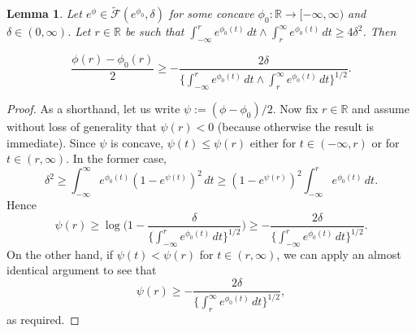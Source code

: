 \documentclass[a4paper,12pt]{article}
\newtheorem{lemma}[theorem]{Lemma}
\begin{document}
%
\begin{lemma}
  \label{Lem:EnvelopeLowerBound}
  Let $e^{\phi} \in \tilde{\mathcal{F}}(e^{\phi_0}, \delta)$ for some concave $\phi_0:\mathbb{R} \rightarrow [-\infty,\infty)$ and $\delta \in (0,\infty)$. Let $r \in \mathbb{R}$ be such that $\int_{-\infty}^r e^{\phi_0(t)} \, dt \wedge \int_r^{\infty} e^{\phi_0(t)} \, dt \geq 4\delta^2$. Then

  \[ 
    \frac{\phi(r) - \phi_0(r)}{2} \geq
    - \frac{2\delta}{\bigl\{ \int_{-\infty}^r e^{\phi_0(t)} \, dt \wedge \int_r^{\infty} e^{\phi_0(t)} \, dt \bigr\}^{1/2}}.
  \]
\end{lemma}
\begin{proof}
As a shorthand, let us write $\psi := (\phi - \phi_0)/2$.  Now fix $r \in \mathbb{R}$ and assume without loss of generality that $\psi(r) < 0$ (because otherwise the result is immediate).  Since $\psi$ is concave, $\psi(t) \leq \psi(r)$ either for $t \in (-\infty, r)$ or for $t \in (r, \infty)$.  In the former case,
  \[
    \delta^2 \geq \int_{-\infty}^\infty e^{\phi_0(t)} (1 - e^{\psi(t)})^2 \, dt \geq (1 - e^{\psi(r)})^2 \int_{-\infty}^r e^{\phi_0(t)} \, dt.
  \]
Hence
\[
   \psi(r) \geq \log \biggl(1 -   \frac{\delta}{\bigl\{\int_{-\infty}^r e^{\phi_0(t)} \, dt \bigr\}^{1/2}} \biggr) \geq - \frac{2\delta}{\bigl\{\int_{-\infty}^r e^{\phi_0(t)} \, dt\bigr\}^{1/2}}.
\]
On the other hand, if $\psi(t) < \psi(r)$ for $t \in (r, \infty)$, we can apply an almost identical argument to see that
  \[
    \psi(r) \geq -\frac{2\delta}{\bigl\{ \int_r^{\infty} e^{\phi_0(t)} \, dt \bigr\}^{1/2}},
  \]
as required.
\end{proof}
\end{document}
